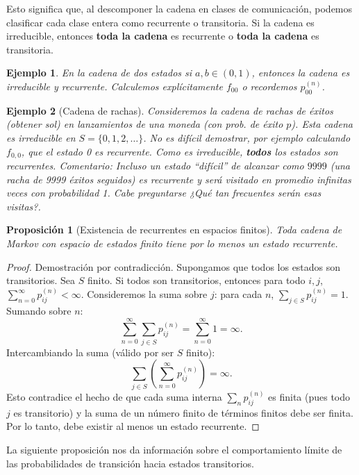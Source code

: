 \documentclass[12pt]{book}
\newtheorem{proposition}{Proposición}[chapter]
\newtheorem{example}{Ejemplo}[chapter]
\begin{document}
Esto significa que, al descomponer la cadena en clases de comunicación, podemos clasificar cada clase entera como recurrente o transitoria. Si la cadena es irreducible, entonces \textbf{toda la cadena} es recurrente o \textbf{toda la cadena} es transitoria.

\begin{example}
En la cadena de dos estados  si $a, b \in (0,1)$, entonces la cadena es irreducible y recurrente. Calculemos explícitamente $f_{00}$ o recordemos $p_{00}^{(n)}$.
\end{example}

\begin{example}[Cadena de rachas]
Consideremos la cadena de rachas de éxitos (obtener sol) en lanzamientos de una moneda (con prob. de éxito $p$). Esta cadena es irreducible en $S = \{0, 1, 2, \dots\}$.
No es difícil demostrar, por ejemplo calculando $f_{0,0}$, que el estado 0 es recurrente. Como es irreducible, \textbf{todos} los estados son recurrentes.
\emph{Comentario:} Incluso un estado ``difícil'' de alcanzar como $9999$ (una racha de 9999 éxitos seguidos) es recurrente y será visitado en promedio infinitas veces con probabilidad 1. Cabe preguntarse ¿Qué tan frecuentes serán esas visitas?.
\end{example}

\begin{proposition}[Existencia de recurrentes en espacios finitos]
Toda cadena de Markov con espacio de estados finito tiene por lo menos un estado recurrente.
\end{proposition}

\begin{proof}
Demostración por contradicción. Supongamos que todos los estados son transitorios.
Sea $S$ finito. Si todos son transitorios, entonces para todo $i, j$, $\sum_{n=0}^\infty p_{ij}^{(n)} < \infty$.
Consideremos la suma sobre $j$: para cada $n$, $\sum_{j \in S} p_{ij}^{(n)} = 1$.
Sumando sobre $n$:
\[
\sum_{n=0}^\infty \sum_{j \in S} p_{ij}^{(n)} = \sum_{n=0}^\infty 1 = \infty.
\]
Intercambiando la suma (válido por ser $S$ finito):
\[
\sum_{j \in S} \left( \sum_{n=0}^\infty p_{ij}^{(n)} \right) = \infty.
\]
Esto contradice el hecho de que cada suma interna $\sum_{n} p_{ij}^{(n)}$ es finita (pues todo $j$ es transitorio) y la suma de un número finito de términos finitos debe ser finita.
Por lo tanto, debe existir al menos un estado recurrente.
\end{proof}

La siguiente proposición nos da información sobre el comportamiento límite de las probabilidades de transición hacia estados transitorios.
\end{document}
